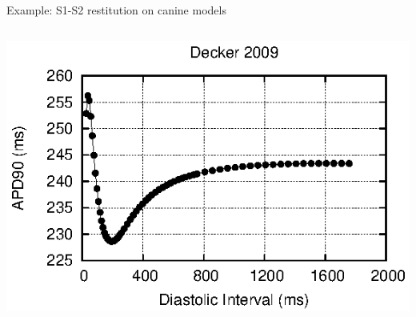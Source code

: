 \documentclass[t,xcolor={usenames,dvipsnames}]{beamer}
\begin{document}
\begin{frame}{Example: S1-S2 restitution on canine models}
\begin{columns}[T]
\begin{column}{.33\linewidth}
\begin{center}
\vspace{.1cm}
\includegraphics[width=\textwidth]{decker_2009_s1s2_curve}
\end{center}
\end{column}
\end{columns}
\end{frame}
\end{document}
